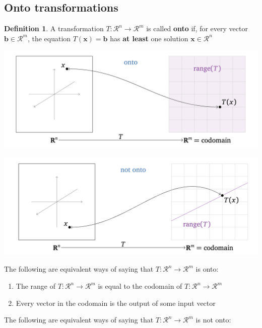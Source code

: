 \documentclass[
]{book}
\theoremstyle{definition}
\newtheorem{definition}{Definition}[chapter]
\theoremstyle{definition}
\theoremstyle{definition}
\theoremstyle{definition}
\theoremstyle{remark}
\begin{document}
\hypertarget{onto-transformations}{%
\subsection{Onto transformations}\label{onto-transformations}}

\begin{definition}
A transformation \(T:\mathcal{R}^n \rightarrow \mathcal{R}^m\) is called \textbf{onto} if, for every vector \(\mathbf{b} \in \mathcal{R}^m\), the equation \(T(\mathbf{x}) = \mathbf{b}\) has \textbf{at least} one solution \(\mathbf{x} \in \mathcal{R}^n\)
\end{definition}

\includegraphics[width=1\linewidth]{images/onto}

\includegraphics[width=1\linewidth]{images/not-onto}

The following are equivalent ways of saying that \(T:\mathcal{R}^n \rightarrow \mathcal{R}^m\) is onto:

\begin{enumerate}
\def\labelenumi{\arabic{enumi})}
\item
  The range of \(T:\mathcal{R}^n \rightarrow \mathcal{R}^m\) is equal to the codomain of \(T:\mathcal{R}^n \rightarrow \mathcal{R}^m\)
\item
  Every vector in the codomain is the output of some input vector
\end{enumerate}

The following are equivalent ways of saying that \(T:\mathcal{R}^n \rightarrow \mathcal{R}^m\) is not onto:
\end{document}
